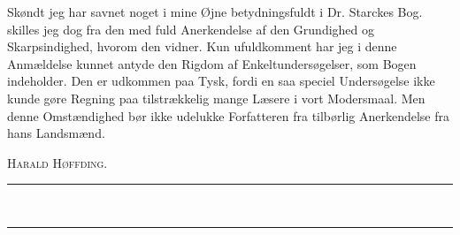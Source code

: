 \documentclass[12pt,a4paper,openany]{book}
\begin{document}
Skøndt jeg har savnet noget i mine Øjne betydningsfuldt i
Dr. Starckes Bog. skilles jeg dog fra den med fuld Anerkendelse
af den Grundighed og Skarpsindighed, hvorom den vidner. Kun
ufuldkomment har jeg i denne Anmældelse kunnet antyde den
Rigdom af Enkeltundersøgelser, som Bogen indeholder. Den er
udkommen paa Tysk, fordi en saa speciel Undersøgelse ikke kunde
gøre Regning paa tilstrækkelig mange Læsere i vort Modersmaal.
Men denne Omstændighed bør ikke udelukke Forfatteren fra tilbørlig
Anerkendelse fra hans Landsmænd.

\begin{flushright}\textsc{Harald Høffding.}\end{flushright}
\begin{center}\rule{2.6cm}{0.4pt}\\[-10pt]\rule{2.6cm}{0.4pt}\end{center}
\end{document}
